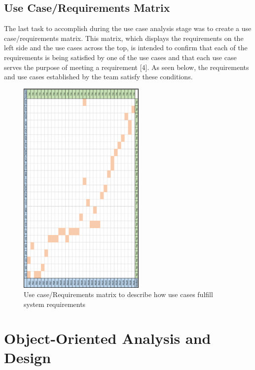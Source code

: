 \newpage

\hypertarget{use-caserequirements-matrix}{%
\subsection{Use Case/Requirements
Matrix}\label{use-caserequirements-matrix}}

The last task to accomplish during the use case analysis stage was to
create a use case/requirements matrix. This matrix, which displays the
requirements on the left side and the use cases across the top, is
intended to confirm that each of the requirements is being satisfied by
one of the use cases and that each use case serves the purpose of
meeting a requirement {[}4{]}. As seen below, the requirements and use
cases established by the team satisfy these conditions.

\begin{figure}[H]
      \centering
      \includegraphics[trim = 0 0 0 0, clip, width=0.55\textwidth]{TempImg/UCRMatrix.png}
      \caption{Use case/Requirements matrix to describe how use cases fulfill system requirements}
 \end{figure}

\hypertarget{object-oriented-analysis-and-design}{%
\section{Object-Oriented Analysis and
Design}\label{object-oriented-analysis-and-design}}

